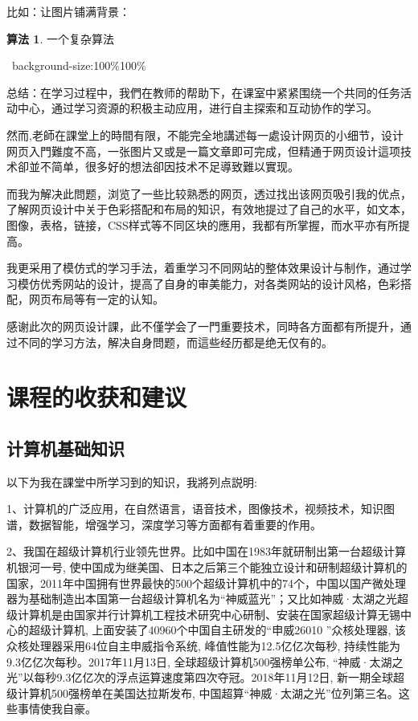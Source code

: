 \documentclass[supercite]{Experimental_Report}
\theoremstyle{definition}
\newtheorem{alg}{算法}[section]
\begin{document}
	比如：让图片铺满背景：
	
	\begin{shaded*}\begin{alg}{一个复杂算法}
			\begin{algorithmic}
				\ background-size:100$\%$100$\%$
			\end{algorithmic}
	\end{alg}\end{shaded*}
	
	总结：在学习过程中，我們在教师的帮助下，在课室中紧紧围绕一个共同的任务活动中心，通过学习资源的积极主动应用，进行自主探索和互动协作的学习。
	
	然而,老師在課堂上的時間有限，不能完全地講述每一處设计网页的小细节，设计网页入門難度不高，一张图片又或是一篇文章即可完成，但精通于网页设计這项技术卻並不简单，很多好的想法卻因技术不足導致難以實现。
	
	而我为解决此問题，浏览了一些比较熟悉的网页，透过找出该网页吸引我的优点，了解网页设计中关于色彩搭配和布局的知识，有效地提过了自己的水平，如文本，图像，表格，链接，CSS样式等不同区块的應用，我都有所掌握，而水平亦有所提高。
	
	我更采用了模仿式的学习手法，着重学习不同网站的整体效果设计与制作，通过学习模仿优秀网站的设计，提高了自身的审美能力，对各类网站的设计风格，色彩搭配，网页布局等有一定的认知。
	
	感谢此次的网页设计課，此不僅学会了一門重要技术，同時各方面都有所提升，通过不同的学习方法，解决自身問题，而這些经历都是绝无仅有的。
	\newpage
	
	\section{课程的收获和建议}
	
	\subsection{计算机基础知识}
	以下为我在課堂中所学习到的知识，我將列点説明:
	
	1、计算机的广泛应用，在自然语言，语音技术，图像技术，视频技术，知识图谱，数据智能，增强学习，深度学习等方面都有着重要的作用。
	
	2、我国在超级计算机行业领先世界。比如中国在1983年就研制出第一台超级计算机银河一号, 使中国成为继美国、日本之后第三个能独立设计和研制超级计算机的国家，2011年中国拥有世界最快的500个超级计算机中的74个，中国以国产微处理器为基础制造出本国第一台超级计算机名为“神威蓝光”；又比如神威·太湖之光超级计算机是由国家并行计算机工程技术研究中心研制、安装在国家超级计算无锡中心的超级计算机, 上面安装了40960个中国自主研发的“申威26010 ”众核处理器, 该众核处理器采用64位自主申威指令系统, 峰值性能为12.5亿亿次每秒, 持续性能为9.3亿亿次每秒。2017年11月13日, 全球超级计算机500强榜单公布, “神威·太湖之光”以每秒9.3亿亿次的浮点运算速度第四次夺冠。2018年11月12日, 新一期全球超级计算机500强榜单在美国达拉斯发布, 中国超算“神威·太湖之光”位列第三名。这些事情使我自豪。
	
\end{document}
